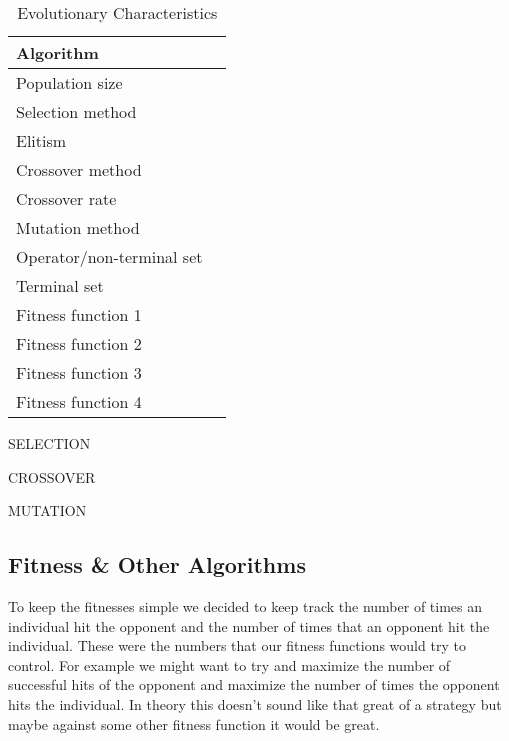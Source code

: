 \documentclass{acm_proc_article-sp}
\begin{document}
\begin{table*}
\centering
\caption{Evolutionary Characteristics}
\label{evochar}
\begin{tabular}{|l|p{4in}|}
\hline
Algorithm & \\
\hline
Population size & \\
\hline
Selection method & \\
\hline
Elitism & \\
\hline
Crossover method & \\
\hline
Crossover rate & \\
\hline
Mutation method & \\
\hline
Operator/non-terminal set & \\
\hline
Terminal set & \\
\hline
Fitness function 1 & \\
\hline
Fitness function 2 & \\
\hline
Fitness function 3 & \\
\hline
Fitness function 4 & \\
\hline
\end{tabular}
\end{table*}

SELECTION

CROSSOVER

MUTATION

\subsection{Fitness \& Other Algorithms} %

To keep the fitnesses simple we decided to keep track the number of times an individual hit the opponent and the number of times that an opponent hit the individual. These were the numbers that our fitness functions would try to control. For example we might want to try and maximize the number of successful hits of the opponent and maximize the number of times the opponent hits the individual. In theory this doesn't sound like that great of a strategy but maybe against some other fitness function it would be great.
\end{document}
